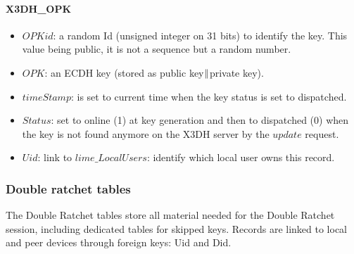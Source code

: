 \documentclass[a4paper,11pt]{article}
\begin{document}
  \paragraph*{X3DH\_OPK}
    \begin{itemize}
      \item $OPKid$: a random Id (unsigned integer on 31 bits) to identify the key. This value being public, it is not a sequence but a random number.
      \item $OPK$: an ECDH key (stored as public key$\Arrowvert $private key).
      \item $timeStamp$: is set to current time when the key status is set to dispatched.
      \item $Status$: set to online (1) at key generation and then to dispatched (0) when the key is not found anymore on the X3DH server by the $update$ request.
      \item $Uid$: link to $lime\_LocalUsers$: identify which local user owns this record.
    \end{itemize}
              
    \subsubsection{Double ratchet tables}
    The Double Ratchet tables store all material needed for the Double Ratchet session, including dedicated tables for skipped keys. Records are linked to local and peer devices through foreign keys: Uid and Did.
\end{document}
